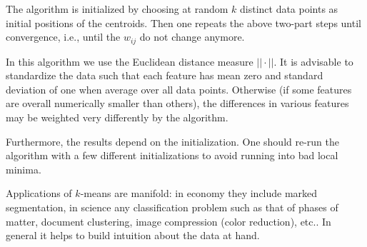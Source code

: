 The algorithm is initialized by choosing at random $k$ distinct data points as initial positions of the centroids. Then one repeats the above two-part steps until convergence, i.e., until the $w_{ij}$ do not change anymore.

In this algorithm we use the Euclidean distance measure $||\cdot ||$. It is advisable to standardize the data such that each feature has mean zero and standard deviation of one when average over all data points. Otherwise (if some features are overall numerically smaller than others), the differences in various features may be weighted very differently by the algorithm.

Furthermore, the results depend on the initialization. One should re-run the algorithm with a few different initializations to avoid running into bad local minima.

Applications of $k$-means are manifold: in economy they include marked segmentation, in science any classification problem such as that of phases of matter, document clustering, image compression (color reduction), etc.. In general it helps to build intuition about the data at hand. 


